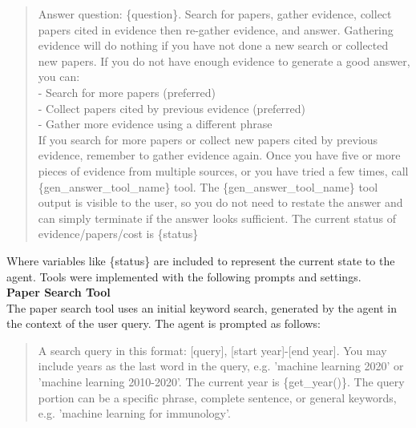 \begin{quote}
Answer question: \{question\}. Search for papers, gather evidence, collect papers cited in evidence then re-gather evidence, and answer. Gathering evidence will do nothing if you have not done a new search or collected new papers. If you do not have enough evidence to generate a good answer, you can:
\\
- Search for more papers (preferred)\\
- Collect papers cited by previous evidence (preferred)\\
- Gather more evidence using a different phrase\\

If you search for more papers or collect new papers cited by previous evidence, remember to gather evidence again. Once you have five or more pieces of evidence from multiple sources, or you have tried a few times, call \{gen\_answer\_tool\_name\} tool. The \{gen\_answer\_tool\_name\} tool output is visible to the user, so you do not need to restate the answer and can simply terminate if the answer looks sufficient. The current status of evidence/papers/cost is \{status\}
\end{quote}

Where variables like \{status\} are included to represent the current state to the agent. Tools were implemented with the following prompts and settings. \\

\textbf{Paper Search Tool} \\

The paper search tool uses an initial keyword search, generated by the agent in the context of the user query. The agent is prompted as follows: 

\begin{quote}
A search query in this format: [query], [start year]-[end year]. You may include years as the last word in the query, e.g. 'machine learning 2020' or 'machine learning 2010-2020'. The current year is \{get\_year()\}. The query portion can be a specific phrase, complete sentence, or general keywords, e.g. 'machine learning for immunology'.
\end{quote}

